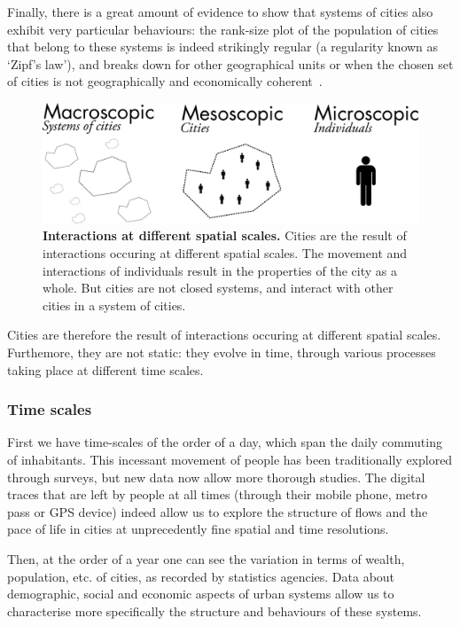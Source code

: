 Finally, there is a great amount of evidence to show that systems of cities also
exhibit very particular behaviours: the rank-size plot of the population of
cities that belong to these systems is indeed strikingly regular (a regularity
known as `Zipf's law'), and breaks down for other geographical units or when the
chosen set of cities is not geographically and economically
coherent~\cite{Cristelli:2012}.\\


\begin{figure}[!h]
    \centering
    \includegraphics[width=\textwidth]{./gfx/chapter-intro/spatial_scales.pdf}
    \caption{{\bf Interactions at different spatial scales.} Cities are the
    result of interactions occuring at different spatial scales. The movement
and interactions of individuals result in the properties of the city as a whole.
But cities are not closed systems, and interact with other cities in a system of
cities.\label{fig:spatialscale}}
\end{figure}


Cities are therefore the result of interactions occuring at different spatial
scales. Furthemore, they are not static: they evolve in time, through various
processes taking place at different time scales.



\subsubsection{Time scales}
\label{ssub:time_scales}

First we have time-scales of the order of a day, which span the daily commuting
of inhabitants. This incessant movement of people has been traditionally
explored through surveys, but new data now allow more thorough studies. The
digital traces that are left by people at all times (through their mobile phone,
metro pass or GPS device) indeed allow us to explore the structure of flows and
the pace of life in cities at unprecedently fine spatial and time resolutions.

Then, at the order of a year one can see the variation in terms of wealth,
population, etc. of cities, as recorded by statistics agencies. Data about
demographic, social and economic aspects of urban systems allow us to
characterise more specifically the structure and behaviours of these systems.

